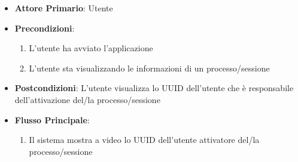 \begin{itemize}
    \item \textbf{Attore Primario}: Utente
    \item \textbf{Precondizioni}:
    \begin{enumerate}
        \item L'utente ha avviato l'applicazione
        \item L'utente sta visualizzando le informazioni di un processo/sessione
    \end{enumerate}
    \item \textbf{Postcondizioni}: L'utente visualizza lo UUID dell'utente che è responsabile dell'attivazione del/la processo/sessione
    \item \textbf{Flusso Principale}:
        \begin{enumerate}
            \item Il sistema mostra a video lo UUID dell'utente attivatore del/la processo/sessione
        \end{enumerate}
\end{itemize}

